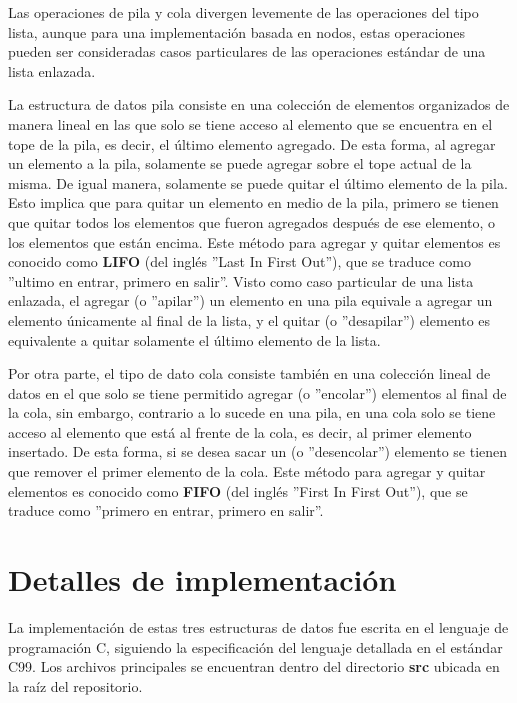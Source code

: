 \documentclass[titlepage,a4paper]{article}
\begin{document}
Las operaciones de pila y cola divergen levemente de las operaciones del tipo lista, aunque para una implementación basada en nodos, estas operaciones pueden ser consideradas casos particulares de las operaciones estándar de una lista enlazada.

La estructura de datos pila consiste en una colección de elementos organizados de manera lineal en las que solo se tiene acceso al elemento que se encuentra en el tope de la pila, es decir, el último elemento agregado. De esta forma, al agregar un elemento a la pila, solamente se puede agregar sobre el tope actual de la misma. De igual manera, solamente se puede quitar el último elemento de la pila. Esto implica que para quitar un elemento en medio de la pila, primero se tienen que quitar todos los elementos que fueron agregados después de ese elemento, o los elementos que están encima. Este método para agregar y quitar elementos es conocido como \textbf{LIFO} (del inglés ''Last In First Out''), que se traduce como ''ultimo en entrar, primero en salir''. Visto como caso particular de una lista enlazada, el agregar (o ''apilar'') un elemento en una pila equivale a agregar un elemento únicamente al final de la lista, y el quitar (o ''desapilar'') elemento es equivalente a quitar solamente el último elemento de la lista.

Por otra parte, el tipo de dato cola consiste también en una colección lineal de datos en el que solo se tiene permitido agregar (o ''encolar'') elementos al final de la cola, sin embargo, contrario a lo sucede en una pila, en una cola solo se tiene acceso al elemento que está al frente de la cola, es decir, al primer elemento insertado. De esta forma, si se desea sacar un (o ''desencolar'') elemento se tienen que remover el primer elemento de la cola. Este método para agregar y quitar elementos es conocido como \textbf{FIFO} (del inglés ''First In First Out''), que se traduce como ''primero en entrar, primero en salir''.


\section{Detalles de implementación}\label{sec:implementacion}

La implementación de estas tres estructuras de datos fue escrita en el lenguaje de programación C, siguiendo la especificación del lenguaje detallada en el estándar C99. Los archivos principales se encuentran dentro del directorio \textbf{src} ubicada en la raíz del repositorio. 
\end{document}
